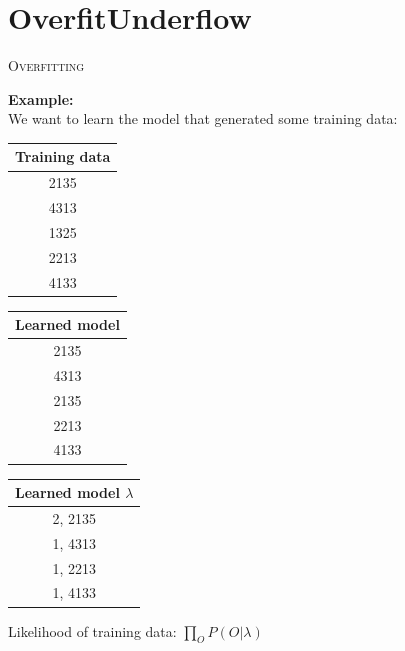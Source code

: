 \section{Overfit\/Underflow}
\begin{frame}
\center \huge \scshape Overfitting
\end{frame}

\begin{frame}
\center
\textbf{Example:}
\\
We want to learn the model that generated some training data:\\
\begin{table}[h]
\begin{tabular}{c}
\multicolumn{1}{l}{\textbf{Training data}} \\ \hline
\multicolumn{1}{|c|}{2135}    \\ \hline
\multicolumn{1}{|c|}{4313}    \\ \hline
\multicolumn{1}{|c|}{1325}    \\ \hline
\multicolumn{1}{|c|}{2213}    \\ \hline
\multicolumn{1}{|c|}{4133}    \\ \hline
\end{tabular}
\end{table}
\end{frame}

\begin{frame}
\begin{table}[h]
\begin{tabular}{c}
\multicolumn{1}{l}{\textbf{Learned model}} \\ \hline
\multicolumn{1}{|c|}{2135}    \\ \hline
\multicolumn{1}{|c|}{4313}    \\ \hline
\multicolumn{1}{|c|}{2135}    \\ \hline
\multicolumn{1}{|c|}{2213}    \\ \hline
\multicolumn{1}{|c|}{4133}    \\ \hline
\end{tabular}
\end{table}
\end{frame}

\begin{frame}
\begin{table}[h]
\begin{tabular}{c}
\multicolumn{1}{l}{\textbf{Learned model $\lambda$}} \\ \hline
\multicolumn{1}{|c|}{2, 2135}    \\ \hline
\multicolumn{1}{|c|}{1, 4313}    \\ \hline
\multicolumn{1}{|c|}{1, 2213}    \\ \hline
\multicolumn{1}{|c|}{1, 4133}    \\ \hline
\end{tabular}
\end{table}
\center
Likelihood of training data: $\prod\limits_O P(O | \lambda)$
\end{frame}

